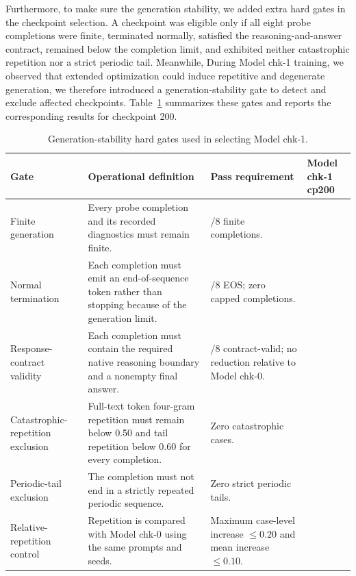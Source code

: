 Furthermore, to make sure the generation stability, we added extra hard gates in the checkpoint selection. A checkpoint was eligible only if all eight probe completions were finite, terminated normally, satisfied the reasoning-and-answer contract, remained below the completion limit, and exhibited neither catastrophic repetition nor a strict periodic tail. Meanwhile, During Model chk-1 training, we observed that extended optimization could induce repetitive and degenerate generation, we therefore introduced a generation-stability gate to detect and exclude affected checkpoints. Table~\ref{tab:app:chk1_generation_stability_gates} summarizes these gates and reports the corresponding results for checkpoint 200.


\begin{table}[htbp]
    \centering
    \footnotesize
    \renewcommand{\arraystretch}{1.16}
    \begin{tabularx}{\textwidth}{@{}
        >{\raggedright\arraybackslash}p{}
        >{\raggedright\arraybackslash}X
        >{\raggedright\arraybackslash}p{}
        >{\raggedright\arraybackslash}p{}
    @{}}
        \toprule
        \textbf{Gate} &
        \textbf{Operational definition} &
        \textbf{Pass requirement} &
        \textbf{Model chk-1 cp200} \\
        \midrule

        Finite generation &
        Every probe completion and its recorded diagnostics must remain finite. &
        8/8 finite completions. \\

        Normal termination &
        Each completion must emit an end-of-sequence token rather than stopping because of the generation limit. &
        8/8 EOS; zero capped completions. \\

        Response-contract validity &
        Each completion must contain the required native reasoning boundary and a nonempty final answer. &
        8/8 contract-valid; no reduction relative to Model chk-0. \\

        Catastrophic-repetition exclusion &
        Full-text token four-gram repetition must remain below 0.50 and tail repetition below 0.60 for every completion. &
        Zero catastrophic cases. \\

        Periodic-tail exclusion &
        The completion must not end in a strictly repeated periodic sequence. &
        Zero strict periodic tails. \\

        Relative-repetition control &
        Repetition is compared with Model chk-0 using the same prompts and seeds. &
        Maximum case-level increase $\leq 0.20$ and mean increase $\leq 0.10$. \\

        \bottomrule
    \end{tabularx}
    \caption{Generation-stability hard gates used in selecting Model chk-1.}
    \label{tab:app:chk1_generation_stability_gates}
\end{table}



